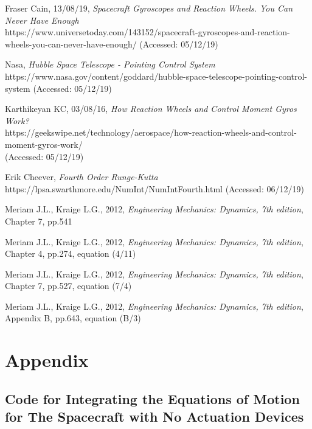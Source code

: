\documentclass[12]{article}
\begin{document}
\begin{multicols*}{2}
\vfill\null
\columnbreak

\begin{thebibliography}{9}

Fraser Cain,
13/08/19,
\textit{Spacecraft Gyroscopes and Reaction Wheels. You Can Never Have Enough} \\
https://www.universetoday.com/143152/spacecraft-gyroscopes-and-reaction-wheels-you-can-never-have-enough/ (Accessed: 05/12/19)

Nasa, \textit{Hubble Space Telescope - Pointing Control System} \\
https://www.nasa.gov/content/goddard/hubble-space-telescope-pointing-control-system (Accessed: 05/12/19)

Karthikeyan KC,
03/08/16,
\textit{How Reaction Wheels and Control Moment Gyros Work?} \\
https://geekswipe.net/technology/aerospace/how-reaction-wheels-and-control-moment-gyros-work/ \\(Accessed: 05/12/19)

Erik Cheever, \textit{Fourth Order Runge-Kutta} \\
https://lpsa.swarthmore.edu/NumInt/NumIntFourth.html (Accessed: 06/12/19)

Meriam J.L., Kraige L.G., 2012, \textit{Engineering Mechanics: Dynamics, 7th edition}, Chapter 7, pp.541

Meriam J.L., Kraige L.G., 2012, \textit{Engineering Mechanics: Dynamics, 7th edition}, Chapter 4, pp.274, equation (4/11)

Meriam J.L., Kraige L.G., 2012, \textit{Engineering Mechanics: Dynamics, 7th edition}, Chapter 7, pp.527, equation (7/4)

Meriam J.L., Kraige L.G., 2012, \textit{Engineering Mechanics: Dynamics, 7th edition}, Appendix B, pp.643, equation (B/3)

\end{thebibliography}

\end{multicols*}

\section{Appendix}

\subsection{Code for Integrating the Equations of Motion for The Spacecraft with No Actuation Devices}
\end{document}
